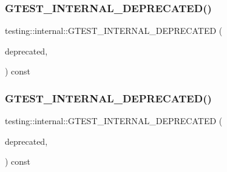 \subsubsection{\texorpdfstring{GTEST\_INTERNAL\_DEPRECATED()}{GTEST\_INTERNAL\_DEPRECATED()}\hspace{0.1cm}{\footnotesize\ttfamily [1/5]}}
{\footnotesize\ttfamily testing\+::internal\+::\+G\+T\+E\+S\+T\+\_\+\+I\+N\+T\+E\+R\+N\+A\+L\+\_\+\+D\+E\+P\+R\+E\+C\+A\+T\+ED (\begin{DoxyParamCaption}\item[{\char`\"{}I\+N\+S\+T\+A\+N\+T\+I\+A\+T\+E\+\_\+\+T\+E\+S\+T\+\_\+\+C\+A\+S\+E\+\_\+P is}]{deprecated,  }\item[{please use \char`\"{} \char`\"{}\mbox{\hyperlink{namespacetesting_a91b2d3c4e8c89bcec13270ae8585d549}{I\+N\+S\+T\+A\+N\+T\+I\+A\+T\+E\+\_\+\+T\+E\+S\+T\+\_\+\+S\+U\+I\+T\+E\+\_\+P}}\char`\"{}}]{ }\end{DoxyParamCaption}) const}

\mbox{\label{namespacetesting_1_1internal_ac2bac410cd8b9ecbc8f4ccc921e61cee}} 
\subsubsection{\texorpdfstring{GTEST\_INTERNAL\_DEPRECATED()}{GTEST\_INTERNAL\_DEPRECATED()}\hspace{0.1cm}{\footnotesize\ttfamily [2/5]}}
{\footnotesize\ttfamily testing\+::internal\+::\+G\+T\+E\+S\+T\+\_\+\+I\+N\+T\+E\+R\+N\+A\+L\+\_\+\+D\+E\+P\+R\+E\+C\+A\+T\+ED (\begin{DoxyParamCaption}\item[{\char`\"{}T\+Y\+P\+E\+D\+\_\+\+T\+E\+S\+T\+\_\+\+C\+A\+S\+E\+\_\+P is}]{deprecated,  }\item[{please use \char`\"{} \char`\"{}\mbox{\hyperlink{namespacetesting_ab6095d387aee3b6b71919177827e78f5}{T\+Y\+P\+E\+D\+\_\+\+T\+E\+S\+T\+\_\+\+S\+U\+I\+T\+E\+\_\+P}}\char`\"{}}]{ }\end{DoxyParamCaption}) const}

\mbox{\label{namespacetesting_1_1internal_ac7c25a00ce37b8f6c7ea16814233b281}} 
